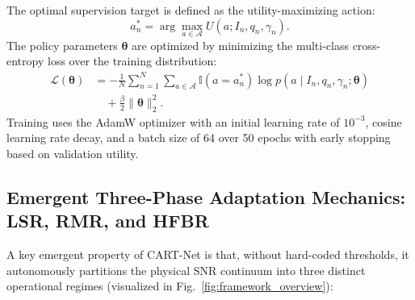 The optimal supervision target is defined as the utility-maximizing action:
\begin{equation}
a_n^* = \arg\max_{a \in \mathcal{A}} U(a; I_n, q_n, \gamma_n).
\end{equation}
The policy parameters $\boldsymbol{\theta}$ are optimized by minimizing the multi-class cross-entropy loss over the training distribution:
\begin{equation}
\begin{split}
\mathcal{L}(\boldsymbol{\theta}) &= -\frac{1}{N} \sum_{n=1}^N \sum_{a \in \mathcal{A}} \mathbb{I}(a = a_n^*) \log p(a \mid I_n, q_n, \gamma_n; \boldsymbol{\theta}) \\
&\quad + \frac{\beta}{2} \|\boldsymbol{\theta}\|_2^2.
\end{split}
\end{equation}
Training uses the AdamW optimizer with an initial learning rate of $10^{-3}$, cosine learning rate decay, and a batch size of 64 over 50 epochs with early stopping based on validation utility.

\subsection{Emergent Three-Phase Adaptation Mechanics: LSR, RMR, and HFBR}
A key emergent property of CART-Net is that, without hard-coded thresholds, it autonomously partitions the physical SNR continuum into three distinct operational regimes (visualized in Fig.~\ref{fig:framework_overview}):

